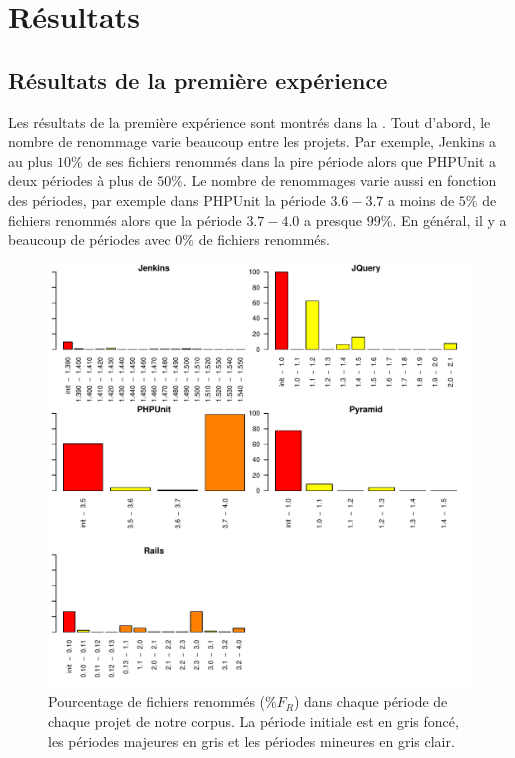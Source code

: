 \section{Résultats}
\label{sec:resultats}

\subsection{Résultats de la première expérience}

Les résultats de la première expérience sont montrés dans la . Tout d'abord, le nombre de renommage varie beaucoup entre les projets. Par exemple, Jenkins a au plus $10\%$ de ses fichiers renommés dans la pire période alors que PHPUnit a deux périodes à plus de $50\%$. Le nombre de renommages varie aussi en fonction des périodes, par exemple dans PHPUnit la période $3.6 - 3.7$ a moins de $5\%$ de fichiers renommés alors que la période $3.7 - 4.0$ a presque $99\%$. En général, il y a beaucoup de périodes avec $0\%$ de fichiers renommés.\\

\begin{figure}[h]
	\centering
	\includegraphics[width=0.85\linewidth,keepaspectratio]{data/figures/renaming.pdf}
	\caption{Pourcentage de fichiers renommés ($\%F_R$) dans chaque période de chaque projet de notre corpus. La période initiale est en gris foncé, les périodes majeures en gris et les périodes mineures en gris clair.}
	\label{fig:renaming}
\end{figure}


